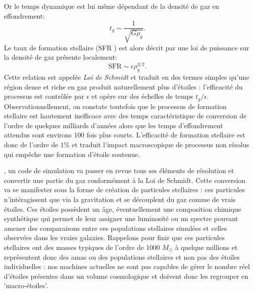 Or le temps dynamique est lui même dépendant de la densité de gaz en effondrement:
\begin{equation}
t_g\sim\frac{1}{\sqrt{G\rho_g}}.
\end{equation}
Le taux de formation stellaire (SFR ) est alors décrit par une loi de puissance sur la densité de gaz présente localement:
\begin{equation}
\mathrm{SFR}\sim \epsilon \rho_g^{3/2}.
\label{e:schmidt}
\end{equation}
Cette relation est appelée \textit{Loi de Schmidt} et traduit en des termes simples qu'une région dense et riche en gaz produit naturellement plus d'étoiles : l'efficacité du processus est contrôlée par $\epsilon$ et opère sur des échelles de temps $t_g/\epsilon$. Observationnellement, on constate toutefois que le processus de formation stellaire est hautement inefficace avec des temps caractéristique de conversion de l'ordre de quelques milliards d'années alors que les temps d'effondrement attendus sont environs 100 fois plus courts. L'efficacité de formation stellaire est donc de l'ordre de $1\%$ et traduit l'impact macroscopique de processus non résolus qui empêche une formation d'étoile soutenue.

, un code de simulation va passer en revue tous ses éléments de résolution et convertir une partie du gaz conformément à la Loi de Schmidt. Cette conversion va se manifester sous la forme de création de particules stellaires : ces particules n'intéragissent que via la gravitation et se découplent du gaz comme de vrais étoiles. Ces étoiles possèdent un âge, éventuellement une composition chimique synthétique qui permet de leur assigner une luminosité ou un spectre pouvant amener des comparaisons entre ces populations stellaires simulées et celles observées dans les vraies galaxies. Rappelons pour finir que ces particules stellaires ont des masses typiques de l'ordre de 1000 $M_\odot$ à quelque millions et représentent donc des amas ou des populations stellaires et non pas des étoiles individuelles : nos machines actuelles ne sont pas capables de gérer le nombre réel d'étoiles présentes dans un volume cosmologique et doivent donc les regrouper en 'macro-étoiles'.

